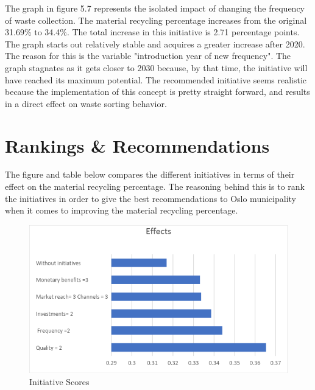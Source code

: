 \indent \newline
The graph in figure 5.7 represents the isolated impact of changing the frequency of waste collection. The material recycling percentage increases from the original 31.69\% to 34.4\%. The total increase in this initiative is 2.71 percentage points. The graph starts out relatively stable and acquires a greater increase after 2020. The reason for this is the variable "introduction year of new frequency". The graph stagnates as it gets closer to 2030 because, by that time, the initiative will have reached its maximum potential. The recommended initiative seems realistic because the implementation of this concept is pretty straight forward, and results in a direct effect on waste sorting behavior. 

\section{Rankings \& Recommendations}

\indent \newline
The figure and table below compares the different initiatives in terms of their effect on the material recycling percentage. The reasoning behind this is to rank the initiatives in order to give the best recommendations to Oslo municipality when it comes to improving the material recycling percentage. 

\begin{figure}[H]
\centering
\includegraphics [scale=0.50,angle=360]{figures/rankedinitiatives.png}
\caption{Initiative Scores}
\label{fig:rankedinitiatives}
\end{figure}

